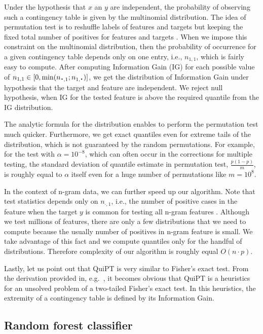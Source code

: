 \documentclass[a4,center,fleqn]{NAR}
\newcommand*{\bigcdot}{\raisebox{-0.25ex}{\scalebox{1.5}{$\cdot$}}}
\begin{document}
  Under the hypothesis that $x$ an $y$ are independent, the probability of 
observing such a contingency table is given by the multinomial distribution. 
The idea of permutation test is to reshuffle labels of features and targets  but 
keeping the fixed total number of positives for features and targets . When we 
impose this constraint on the multinomial distribution, then the probability of occurrence 
for a given contingency table depends only on one entry, i.e., $n_{1,1}$, which is 
fairly easy to compute. After computing Information Gain (IG) for each possible 
value of $n_{1,1} \in [0,\min(n_{\bigcdot, 1}; n_{1, \bigcdot})]$, we get the 
distribution of Information Gain under hypothesis that the target and feature are 
independent. We reject null hypothesis, when IG for the tested feature is above 
the required quantile from the IG distribution.

  The analytic formula for the distribution enables to perform the
permutation test much quicker. Furthermore, we get exact quantiles even for 
extreme tails of the distribution, which is not guaranteed by the random 
permutations. For example, for the test with $\alpha=10^{-8}$, which 
can often occur in the corrections for multiple testing, the standard deviation of quantile 
estimate in permutation test, $\frac{p(1-p)}{m}$, is roughly equal to $\alpha$ itself even for 
a huge number of permutations like $m=10^8$.

  In the context of n-gram data, we can further speed up our algorithm. Note 
that test statistics depends only on $n_{\cdot, 1}$, i.e., the number of positive cases in the 
feature when the target $y$ is common for testing all n-gram features . Although we test millions 
of features, there are only a few distributions that we need to compute because the usually number 
of positives in n-gram feature is small. We take advantage of this fact and we compute quantiles 
only for the handful of distributions. Therefore complexity of our algorithm is roughly equal $O(n\cdot p)$.

  Lastly, let us point out that QuiPT is very similar to Fisher's exact test. 
From the derivation provided in, e.g.~\citep{lehmann_testing_2008}, it becomes 
obvious that QuiPT is a heuristics for an unsolved problem of a two-tailed 
Fisher's exact test. In this heuristics, the extremity of a contingency table is 
defined by its Information Gain.

\subsection{Random forest classifier}
\end{document}
